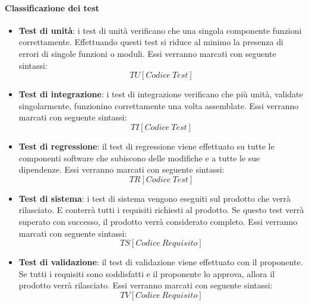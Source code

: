 \documentclass[../NormeDiProgetto_v3.0.0.tex]{subfiles}
\begin{document}
		\paragraph{Classificazione dei test}
			\begin{itemize}
			\item \textbf{Test di unità}:
			i test di unità verificano che una singola componente funzioni correttamente. Effettuando questi test si riduce al minimo la presenza di errori di singole funzioni o moduli. Essi verranno marcati con seguente sintassi:\\
			\begin{equation*}
				TU[Codice \ Test]
			\end{equation*}
			\item \textbf{Test di integrazione}:
			i test di integrazione verificano che più unità, validate singolarmente, funzionino correttamente una volta assemblate. Essi verranno marcati con seguente sintassi:\\
			\begin{equation*}
			TI[Codice \ Test]
			\end{equation*}
			\item \textbf{Test di regressione}:
			il test di regressione viene effettuato su tutte le componenti software che subiscono delle modifiche e a tutte le sue dipendenze.
			Essi verranno marcati con seguente sintassi:\\
			\begin{equation*}
			TR[Codice \ Test]
			\end{equation*}
			\item \textbf{Test di sistema}:
			i test di sistema vengono eseguiti sul prodotto che verrà rilasciato. E conterrà tutti i requisiti richiesti al prodotto. Se questo test verrà superato con successo, il prodotto verrà considerato completo.
			Essi verranno marcati con seguente sintassi:\\
			\begin{equation*}
			TS[Codice \ Requisito]
			\end{equation*}
			\item \textbf{Test di validazione}:
			il test di validazione viene effettuato con il proponente. Se tutti i requisiti sono soddisfatti e il proponente lo approva, allora il prodotto verrà rilasciato.
			Essi verranno marcati con seguente sintassi:\\
			\begin{equation*}
			TV[Codice \ Requisito]
			\end{equation*}
			\end{itemize}
\end{document}
